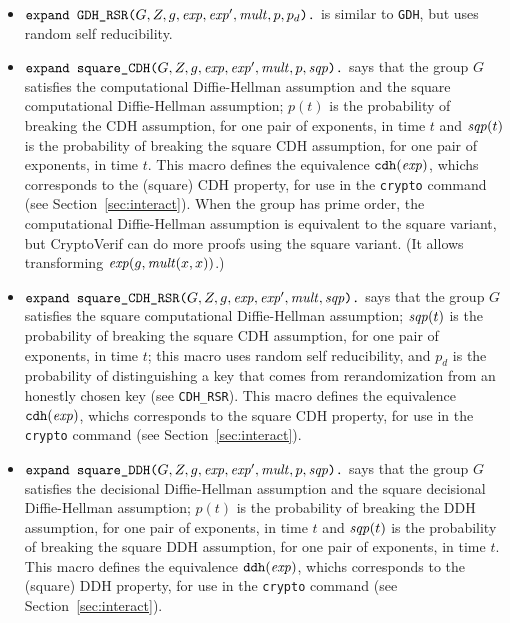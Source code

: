 \documentclass{article}
\begin{document}
\begin{itemize}
\begin{itemize}
\begin{itemize}
     \item $\texttt{expand\ GDH\_RSR(}G, Z, g, \mathit{exp}, \mathit{exp}', \mathit{mult}, p, p_d\texttt{).}$ 
       is similar to \texttt{GDH}, but uses random self reducibility.

     \item
       $\texttt{expand\ square\_CDH(}G, Z, g, \mathit{exp}, \mathit{exp}',
       \mathit{mult}, p, \mathit{sqp}\texttt{).}$
       says that the group $G$ satisfies the computational
       Diffie-Hellman assumption and the square computational
       Diffie-Hellman assumption; $p(t)$ is the probability of
       breaking the CDH assumption, for one pair of exponents, in time
       $t$ and $\mathit{sqp}(t)$ is the probability of breaking the square
       CDH assumption, for one pair of exponents, in time $t$.  This
       macro defines the equivalence $\texttt{cdh}(\mathit{exp})$, whichs
       corresponds to the (square) CDH property, for use in the
       \texttt{crypto} command (see Section~\ref{sec:interact}). When
       the group has prime order, the computational Diffie-Hellman
       assumption is equivalent to the square variant, but CryptoVerif
       can do more proofs using the square variant. (It allows
       transforming $\mathit{exp}(g, \mathit{mult}(x,x))$.)

     \item
       $\texttt{expand\ square\_CDH\_RSR(}G, Z, g, \mathit{exp},
       \mathit{exp}', \mathit{mult}, \mathit{sqp}\texttt{).}$ says that the group
       $G$ satisfies the square computational Diffie-Hellman
       assumption; $\mathit{sqp}(t)$ is the probability of breaking the
       square CDH assumption, for one pair of exponents, in time $t$;
       this macro uses random self reducibility, and $p_d$ is the
       probability of distinguishing a key that comes from
       rerandomization from an honestly chosen key (see
       \texttt{CDH\_RSR}). This macro defines the equivalence
       $\texttt{cdh}(\mathit{exp})$, whichs corresponds to the square CDH
       property, for use in the \texttt{crypto} command (see
       Section~\ref{sec:interact}).

     \item
       $\texttt{expand\ square\_DDH(}G, Z, g, \mathit{exp}, \mathit{exp}',
       \mathit{mult}, p, \mathit{sqp}\texttt{).}$
       says that the group $G$ satisfies the decisional Diffie-Hellman
       assumption and the square decisional Diffie-Hellman assumption;
       $p(t)$ is the probability of breaking the DDH assumption, for
       one pair of exponents, in time $t$ and $\mathit{sqp}(t)$ is the
       probability of breaking the square DDH assumption, for one pair
       of exponents, in time $t$.  This macro defines the equivalence
       $\texttt{ddh}(\mathit{exp})$, whichs corresponds to the (square)
       DDH property, for use in the \texttt{crypto} command (see
       Section~\ref{sec:interact}).


\end{itemize}
\end{itemize}
\end{itemize}
\end{document}
